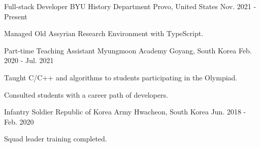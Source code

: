 

\begin{cventries}

  \cventry
  {Full-stack Developer} %
  {BYU History Department} %
  {Provo, United States} %
  {Nov. 2021 - Present} %
  {
    \begin{cvitems} %
      \item {Managed Old Assyrian Research Environment with TypeScript.}
    \end{cvitems}
  }

  \cventry
  {Part-time Teaching Assistant} %
  {Myungmoon Academy} %
  {Goyang, South Korea} %
  {Feb. 2020 - Jul. 2021} %
  {
    \begin{cvitems} %
      \item {Taught C/C++ and algorithms to students participating in the Olympiad.}
      \item {Consulted students with a career path of developers.}
    \end{cvitems}
  }

  \cventry
  {Infantry Soldier} %
  {Republic of Korea Army} %
  {Hwacheon, South Korea} %
  {Jun. 2018 - Feb. 2020} %
  {
    \begin{cvitems} %
      \item {Squad leader training completed.}
    \end{cvitems}
  }

\end{cventries}

